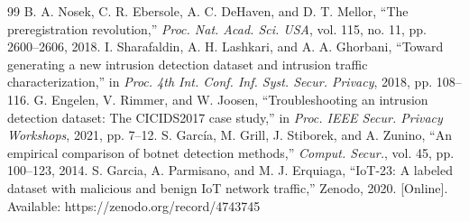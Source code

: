 \begin{thebibliography}{99}
 B. A. Nosek, C. R. Ebersole, A. C. DeHaven, and D. T. Mellor, ``The preregistration revolution,'' \emph{Proc. Nat. Acad. Sci. USA}, vol. 115, no. 11, pp. 2600--2606, 2018.
 I. Sharafaldin, A. H. Lashkari, and A. A. Ghorbani, ``Toward generating a new intrusion detection dataset and intrusion traffic characterization,'' in \emph{Proc. 4th Int. Conf. Inf. Syst. Secur. Privacy}, 2018, pp. 108--116.
 G. Engelen, V. Rimmer, and W. Joosen, ``Troubleshooting an intrusion detection dataset: The CICIDS2017 case study,'' in \emph{Proc. IEEE Secur. Privacy Workshops}, 2021, pp. 7--12.
 S. Garc\'ia, M. Grill, J. Stiborek, and A. Zunino, ``An empirical comparison of botnet detection methods,'' \emph{Comput. Secur.}, vol. 45, pp. 100--123, 2014.
 S. Garcia, A. Parmisano, and M. J. Erquiaga, ``IoT-23: A labeled dataset with malicious and benign IoT network traffic,'' Zenodo, 2020. [Online]. Available: https://zenodo.org/record/4743745
\end{thebibliography}
